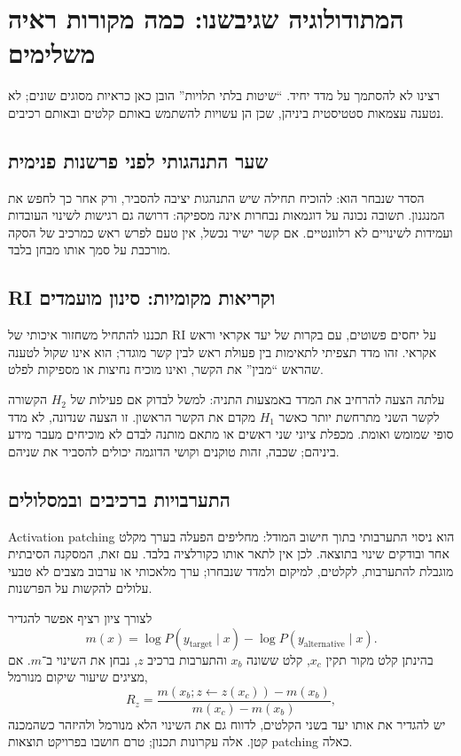 \documentclass[11pt,a4paper]{article}
\newcommand{\en}[1]{\textenglish{#1}}
\begin{document}
\section{המתודולוגיה שגיבשנו: כמה מקורות ראיה משלימים}
רצינו לא להסתמך על מדד יחיד. ``שיטות בלתי תלויות'' הובן כאן כראיות מסוגים שונים; לא נטענה עצמאות סטטיסטית ביניהן, שכן הן עשויות להשתמש באותם קלטים ובאותם רכיבים.

\subsection{שער התנהגותי לפני פרשנות פנימית}
הסדר שנבחר הוא: להוכיח תחילה שיש התנהגות יציבה להסביר, ורק אחר כך לחפש את המנגנון. תשובה נכונה על דוגמאות נבחרות אינה מספיקה: דרושה גם רגישות לשינוי העובדות ועמידות לשינויים לא רלוונטיים. אם קשר ישיר נכשל, אין טעם לפרש ראש כמרכיב של הסקה מורכבת על סמך אותו מבחן בלבד.

\subsection{RI וקריאות מקומיות: סינון מועמדים}
תכננו להתחיל משחזור איכותי של \en{RI} על יחסים פשוטים, עם בקרות של יעד אקראי וראש אקראי. זהו מדד תצפיתי לתאימות בין פעולת ראש לבין קשר מוגדר; הוא אינו שקול לטענה שהראש ``מבין'' את הקשר, ואינו מוכיח נחיצות או מספיקות לפלט.

עלתה הצעה להרחיב את המדד באמצעות התניה: למשל לבדוק אם פעילות של $H_2$ הקשורה לקשר השני מתרחשת יותר כאשר $H_1$ מקדם את הקשר הראשון. זו הצעה שנדונה, לא מדד סופי שמומש ואומת. מכפלת ציוני שני ראשים או מתאם מותנה לבדם לא מוכיחים מעבר מידע ביניהם; שכבה, זהות טוקנים וקושי הדוגמה יכולים להסביר את שניהם.

\subsection{התערבויות ברכיבים ובמסלולים}
\en{Activation patching} הוא ניסוי התערבותי בתוך חישוב המודל: מחליפים הפעלה בערך מקלט אחר ובודקים שינוי בתוצאה. לכן אין לתאר אותו כקורלציה בלבד. עם זאת, המסקנה הסיבתית מוגבלת להתערבות, לקלטים, למיקום ולמדד שנבחרו; ערך מלאכותי או ערבוב מצבים לא טבעי עלולים להקשות על הפרשנות.

לצורך ציון רציף אפשר להגדיר
\[
 m(x)=\log P(y_{\mathrm{target}}\mid x)-\log P(y_{\mathrm{alternative}}\mid x).
\]
בהינתן קלט מקור תקין $x_c$, קלט ששונה $x_b$ והתערבות ברכיב $z$, נבחן את השינוי ב־$m$. אם מציגים שיעור שיקום מנורמל,
\[
 R_z=\frac{m(x_b;z\leftarrow z(x_c))-m(x_b)}{m(x_c)-m(x_b)},
\]
יש להגדיר את אותו יעד בשני הקלטים, לדווח גם את השינוי הלא מנורמל ולהיזהר כשהמכנה קטן. אלה עקרונות תכנון; טרם חושבו בפרויקט תוצאות \en{patching} כאלה.
\end{document}

